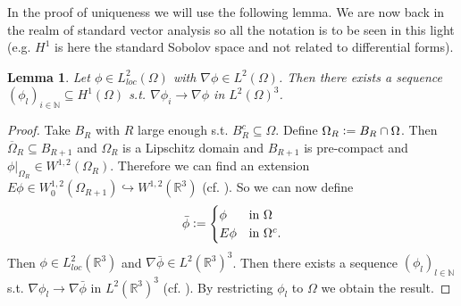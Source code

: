 \documentclass[12pt,a4paper]{article}
\newtheorem{lemma}{Lemma}
\theoremstyle{definition}
\newcommand{\naturalnum}{\mathbb{N}}
\newcommand{\real}{\mathbb{R}}
\begin{document}
In the proof of uniqueness we will use the following lemma. 
We are now back in the realm of standard vector analysis so all the notation
is to be seen in this light (e.g. $H^1$ is here the standard Sobolov space 
and not related to differential forms).

\begin{lemma}
    Let $\phi \in L^2_{loc}(\Omega)$ with $\nabla \phi \in L^2(\Omega)$. Then 
    there exists a sequence $(\phi_l)_{i \in \naturalnum} \subseteq H^1(\Omega)$
    s.t. $\nabla \phi_i \rightarrow \nabla \phi$ in $L^2(\Omega)^3$.
\end{lemma}
\begin{proof}
    Take $B_R$ with $R$ large enough s.t. $B_R^c \subseteq \Omega$. 
    Define $\Omega_R \vcentcolon= B_R \cap \Omega$. Then 
    $\overline{\Omega}_R \subseteq B_{R+1}$ and $\Omega_R$ is a Lipschitz 
    domain and $B_{R+1}$ is pre-compact and
    $\phi|_{\Omega_R} \in W^{1,2}(\Omega_R)$. Therefore we can find an extension
    $E\phi \in W_0^{1,2}(\Omega_{R+1}) \hookrightarrow W^{1,2}(\mathbb{R}^3)$
    (cf. \cite[Thm.\,5.2.1]{sobolev}). So we can now define
    \begin{align*}
    \bar{\phi} \vcentcolon=
    \begin{cases}
        \phi & \mbox{in $\Omega$}\\
        E\phi & \mbox{in $\Omega^c$.}\\
    \end{cases}
    \end{align*}
    Then $\phi \in L^2_{loc}(\real^3)$ and 
    $\nabla \bar{\phi} \in L^2(\real^3)^3$. 
    Then there exists a sequence $(\phi_l) _{l \in \naturalnum}$ s.t.
    $\nabla \phi_l \rightarrow \nabla \bar{\phi}$ in $L^2(\real^3)^3$ 
    (cf. \cite[Lemma\,1.1]{simader}). By restricting $\phi_l$ to $\Omega$ 
    we obtain the result.
\end{proof}

\end{document}
